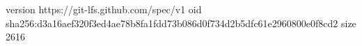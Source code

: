version https://git-lfs.github.com/spec/v1
oid sha256:d3a16aef320f3ed4ae78b8fa1fdd73b086d0f734d2b5dfc61e2960800e0f8cd2
size 2616
